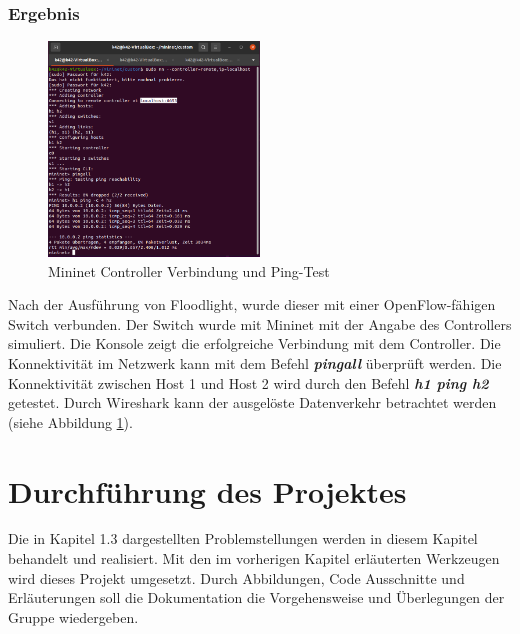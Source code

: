 \documentclass[fontsize=12pt,paper=a4,open=any,parskip=half,
  twoside=false,toc=listof,toc=bibliography,fleqn,leqno,
  captions=nooneline,captions=tableabove,british]{scrbook}
\begin{document}
\newpage
\subsection{Ergebnis}


\setlength{\intextsep}{0pt}
\setlength{\columnsep}{15pt}
\begin{figure}
    \centering
    \includegraphics[width=0.5\textwidth]{Bilder/ping}
    \caption{Mininet Controller Verbindung und Ping-Test}
    \label{ping}
\end{figure}

Nach der Ausführung von Floodlight, wurde dieser mit einer OpenFlow-fähigen Switch verbunden. Der Switch wurde mit Mininet mit der Angabe des Controllers simuliert. Die Konsole zeigt die erfolgreiche Verbindung mit dem Controller. Die Konnektivität im Netzwerk kann mit dem Befehl \textit{\textbf{pingall}} überprüft werden. Die Konnektivität zwischen Host 1 und Host 2 wird durch den Befehl \textit{\textbf{h1 ping h2}} getestet. Durch Wireshark kann der ausgelöste Datenverkehr betrachtet werden (siehe Abbildung \ref{ping}).



\chapter{Durchführung des Projektes}
Die in Kapitel 1.3 dargestellten Problemstellungen werden in diesem Kapitel behandelt und realisiert. Mit den im vorherigen Kapitel erläuterten Werkzeugen wird dieses Projekt umgesetzt. Durch Abbildungen, Code Ausschnitte und Erläuterungen soll die Dokumentation die Vorgehensweise und Überlegungen der Gruppe wiedergeben. 
\end{document}
